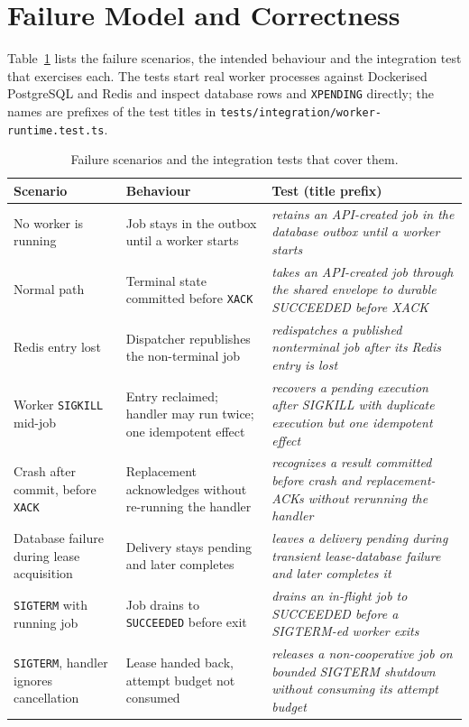 \documentclass[conference]{IEEEtran}
\newcommand{\code}[1]{\texttt{\small #1}}
\begin{document}
\section{Failure Model and Correctness}
\label{sec:failure}
Table~\ref{tab:failure} lists the failure scenarios, the intended behaviour and the integration test that exercises each. The tests start real worker processes against Dockerised PostgreSQL and Redis and inspect database rows and \code{XPENDING} directly; the names are prefixes of the test titles in \code{tests/integration/worker-runtime.test.ts}.

\begin{table}[t]
\caption{Failure scenarios and the integration tests that cover them.}
\label{tab:failure}
\centering
\small
\begin{tabular}{p{4.0cm}p{5.4cm}p{6.6cm}}
\toprule
Scenario & Behaviour & Test (title prefix) \\
\midrule
No worker is running & Job stays in the outbox until a worker starts & \emph{retains an API-created job in the database outbox until a worker starts} \\
Normal path & Terminal state committed before \code{XACK} & \emph{takes an API-created job through the shared envelope to durable SUCCEEDED before XACK} \\
Redis entry lost & Dispatcher republishes the non-terminal job & \emph{redispatches a published nonterminal job after its Redis entry is lost} \\
Worker \code{SIGKILL} mid-job & Entry reclaimed; handler may run twice; one idempotent effect & \emph{recovers a pending execution after SIGKILL with duplicate execution but one idempotent effect} \\
Crash after commit, before \code{XACK} & Replacement acknowledges without re-running the handler & \emph{recognizes a result committed before crash and replacement-ACKs without rerunning the handler} \\
Database failure during lease acquisition & Delivery stays pending and later completes & \emph{leaves a delivery pending during transient lease-database failure and later completes it} \\
\code{SIGTERM} with running job & Job drains to \code{SUCCEEDED} before exit & \emph{drains an in-flight job to SUCCEEDED before a SIGTERM-ed worker exits} \\
\code{SIGTERM}, handler ignores cancellation & Lease handed back, attempt budget not consumed & \emph{releases a non-cooperative job on bounded SIGTERM shutdown without consuming its attempt budget} \\

\end{tabular}
\end{table}
\end{document}
